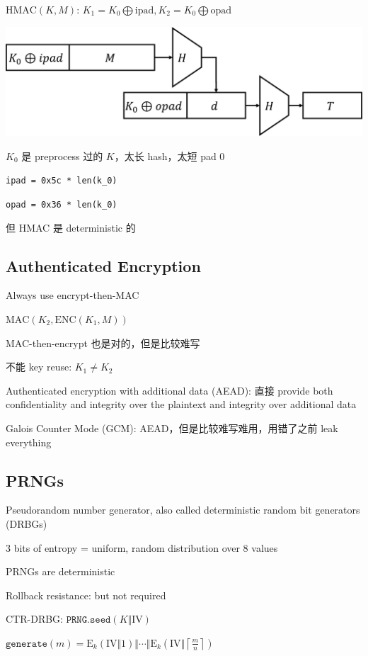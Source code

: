 \documentclass[9pt,landscape]{article}
\begin{document}
\begin{multicols}{2}
$\mathrm{HMAC}(K, M)$: $K_1=K_0\bigoplus \mathrm{ipad}, K_2=K_0\bigoplus\mathrm{opad}$

\includegraphics[width=\columnwidth]{imgs/HMAC}

$K_0$ 是 preprocess 过的 $K$，太长 hash，太短 pad 0

\texttt{ipad = 0x5c * len(k\_0)}

\texttt{opad = 0x36 * len(k\_0)}

但 HMAC 是 deterministic 的

\subsection{Authenticated Encryption}

Always use encrypt-then-MAC

$\mathrm{MAC}(K_2, \mathrm{ENC}(K_1, M))$

MAC-then-encrypt 也是对的，但是比较难写

不能 key reuse: $K_1\neq K_2$

Authenticated encryption with additional data (AEAD): 直接 provide both confidentiality and integrity over the plaintext and integrity over additional data

Galois Counter Mode (GCM): AEAD，但是比较难写难用，用错了之前 leak everything

\subsection{PRNGs}

Pseudorandom number generator, also called deterministic random bit generators (DRBGs)

3 bits of entropy = uniform, random distribution over 8 values

PRNGs are deterministic

Rollback resistance: but not required

CTR-DRBG: $\mathtt{PRNG.seed}(K\Vert\mathrm{IV})$

$\mathtt{generate}(m)=\mathrm{E}_k(\mathrm{IV}\Vert 1)\Vert\cdots\Vert\mathrm{E}_k\left(\mathrm{IV}\Vert \left\lceil\frac{m}{n}\right\rceil\right)$


\end{multicols}
\end{document}
